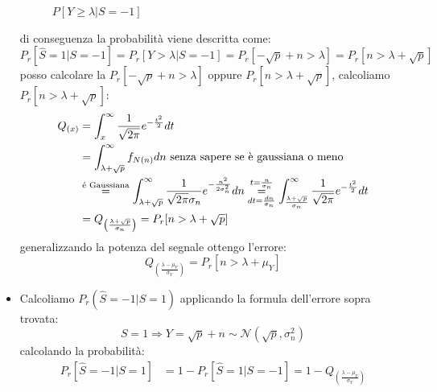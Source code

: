 \begin{itemize}
{\begin{figure}[H]
                        \caption{{\color{red}$P[Y\geq \lambda|S=-1]$}}
                    \end{figure}               
                    di conseguenza la probabilità viene descritta come:
                    \[
                        P_r[\hat{S} = 1|S=-1] = P_r[Y> \lambda|S=-1] = P_r[-\sqrt{p}+n > \lambda] =P_r[n > \lambda+\sqrt{p}]
                    \]
                    posso calcolare la $P_r[-\sqrt{p}+n > \lambda]$ oppure $P_r[n > \lambda+\sqrt{p}]$, calcoliamo $P_r[n > \lambda+\sqrt{p}]$:
                    \begin{align}
                        Q_{(x)} &= \int_{x}^{\infty} \frac{1}{\sqrt{2\pi}} e^{-\frac{t^2}{2}}dt\nonumber \\
                                &= \int_{\lambda+\sqrt{p}}^{\infty}f_{N(n)}dn\text{ senza sapere se è gaussiana o meno}\nonumber \\
                                &\overset{\text{é Gaussiana}}{=} \int_{\lambda+\sqrt{p}}^{\infty}\frac{1}{\sqrt{2\pi}\sigma_n}e^{-\frac{n^2}{2\sigma_n^2}}dn \overunderset{t = \frac{n}{\sigma_n}}{dt = \frac{dn}{\sigma_n}}{=} \int_{\frac{\lambda+\sqrt{p}}{\sigma_n}}^{\infty}\frac{1}{\sqrt{2\pi}}e^{-\frac{t^2}{2}}dt\nonumber \\
                                &= Q_{\left(\frac{\lambda +\sqrt{p}}{\sigma_n}\right)} = P_r[n>\lambda + \sqrt{p}]\nonumber 
                    \end{align}
                    generalizzando la potenza del segnale ottengo l'errore:
                    \[
                        Q_{\displaystyle\left(\frac{\lambda -\mu_Y}{\sigma_Y}\right)} = P_r[n>\lambda + \mu_Y]
                    \]
                }
                \item {Calcoliamo ${P_r(\hat{S}=-1|S=1)}$ applicando la formula dell'errore sopra trovata:
                    \[
                        S=1\Rightarrow Y = \sqrt{p}+n\sim\mathcal{N}(\sqrt{p},\sigma_n^2)  
                    \]
                    calcolando la probabilità:
                    \begin{align}
                        P_r[\hat{S}=-1|S=1] &= 1-P_r[\hat{S}=1|S=-1] = 1- Q_{\displaystyle\left(\frac{\lambda -\mu_Y}{\sigma_Y}\right)}  \nonumber \\

\end{align}}
\end{itemize}
